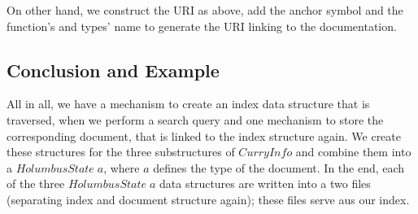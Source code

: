 \documentclass[%
	pdftex,%
	a4paper,%
	oneside,%
	chapterprefix,%
	headsepline,%
	12pt%
]{scrbook}
\newcommand{\Conid}[1]{\mathit{#1}}
\newcommand{\Varid}[1]{\mathit{#1}}
\begin{document}
On other hand, we construct the URI as above, add the anchor symbol
and the function's and types' name to generate the URI linking to the
documentation.
     



\subsection{Conclusion and Example}
All in all, we have a mechanism to create an index data structure that
is traversed, when we perform a search query and one mechanism to
store the corresponding document, that is linked to the index
structure again. %
We create these structures for the three substructures of \ensuremath{\Conid{CurryInfo}}
and combine them into a \ensuremath{\Conid{HolumbusState}\;\Varid{a}}, where \ensuremath{\Varid{a}} defines the type
of the document. %
In the end, each of the three \ensuremath{\Conid{HolumbusState}\;\Varid{a}} data structures are
written into a two files (separating index and document structure
again); these files serve aus our index. \\
\end{document}
